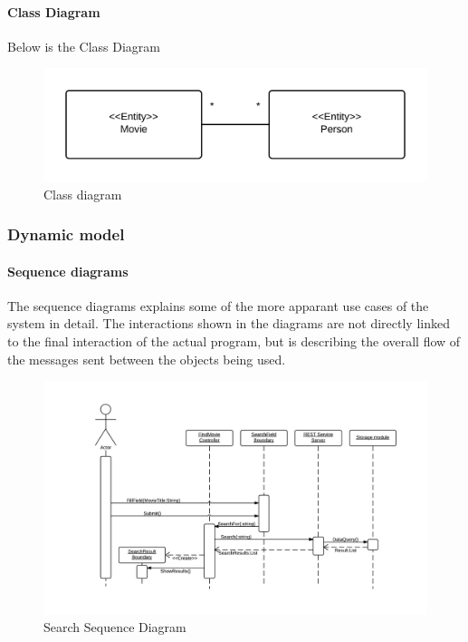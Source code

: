 \paragraph{Class Diagram}
Below is the Class Diagram
\begin{figure}[h]
\includegraphics[width=\linewidth]{img/RAD/ClassDiagram.png}
\caption{Class diagram}
\label{fig:Class diagram}
\end{figure}

\newpage
\subsubsection{Dynamic model}

\paragraph{Sequence diagrams}

The sequence diagrams explains some of the more apparant use cases of the system in detail. The interactions shown in the diagrams are not directly linked to the final interaction of the actual program, but is describing the overall flow of the messages sent between the objects being used.

\begin{figure}[H]
\begin{center}
\includegraphics[width=\linewidth]{img/RAD/SearchSequenceDiagram.png}
\caption{Search Sequence Diagram}
\label{fig:Search Sequence Diagram}
\end{center}
\end{figure}


